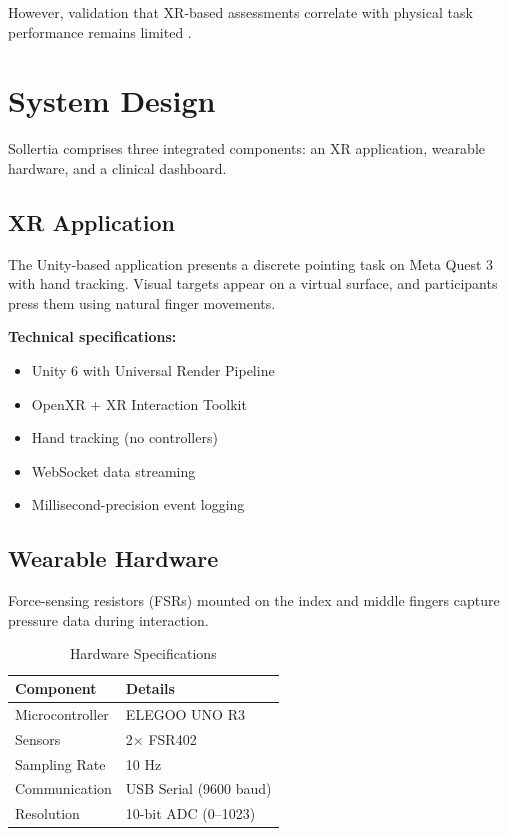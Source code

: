 \documentclass[11pt,twocolumn]{article}
\begin{document}
However, validation that XR-based assessments correlate with physical task performance remains limited \citep{schneider2021accuracy}.

\section{System Design}

Sollertia comprises three integrated components: an XR application, wearable hardware, and a clinical dashboard.

\subsection{XR Application}

The Unity-based application presents a discrete pointing task on Meta Quest 3 with hand tracking. Visual targets appear on a virtual surface, and participants press them using natural finger movements.

\textbf{Technical specifications:}
\begin{itemize}
    \item Unity 6 with Universal Render Pipeline
    \item OpenXR + XR Interaction Toolkit
    \item Hand tracking (no controllers)
    \item WebSocket data streaming
    \item Millisecond-precision event logging
\end{itemize}

\subsection{Wearable Hardware}

Force-sensing resistors (FSRs) mounted on the index and middle fingers capture pressure data during interaction.

\begin{table}[H]
\centering
\caption{Hardware Specifications}
\begin{tabular}{ll}
\toprule
\textbf{Component} & \textbf{Details} \\
\midrule
Microcontroller & ELEGOO UNO R3 \\
Sensors & 2$\times$ FSR402 \\
Sampling Rate & 10 Hz \\
Communication & USB Serial (9600 baud) \\
Resolution & 10-bit ADC (0--1023) \\
\bottomrule
\end{tabular}
\label{tab:hardware}
\end{table}
\end{document}
